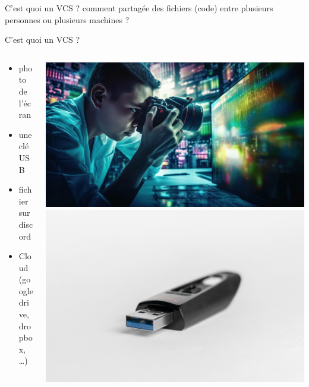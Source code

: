 \documentclass[usenames,dvipsnames]{beamer}
\begin{document}
\begin{frame}[fragile]{C'est quoi un VCS ?}
	comment partagée des fichiers (code) entre plusieurs personnes ou plusieurs machines ?
\end{frame}

\begin{frame}[fragile]{C'est quoi un VCS ?}
	\begin{columns}
		\begin{column}{0.5\linewidth}
			\begin{itemize}
				\item<1-> photo de l'écran
				\item<2-> une clé USB
				\item<3-> fichier sur discord
				\item<4-> Cloud (google drive, dropbox, \dots)
			\end{itemize}
		\end{column}
		\begin{column}{0.5\linewidth}
			\begin{overprint}
				\includegraphics[width=\linewidth]{Im/taking_picture_sreen.jpeg}
				\onslide<2>\includegraphics[width=\linewidth]{Im/thumb_drive.jpg}

\end{overprint}
\end{column}
\end{columns}
\end{frame}
\end{document}
